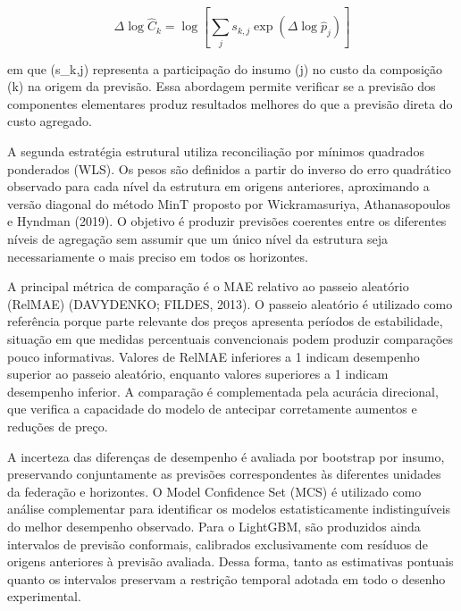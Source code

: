 \begin{equation} 
    \Delta \log \widehat{C}_{k} 
    = 
    \log 
    \left[ 
        \sum_{j} 
        s_{k,j} 
        \exp 
        \left( 
            \Delta \log \widehat{p}_{j} 
            \right) 
            \right] 
            \label{eq:previsao-bottom-up} 
        \end{equation}

em que (s_{k,j}) representa a participação do insumo (j) no custo da composição (k) na origem da previsão. Essa abordagem 
permite verificar se a previsão dos componentes elementares produz resultados melhores do que a previsão direta do custo 
agregado.

A segunda estratégia estrutural utiliza reconciliação por mínimos quadrados ponderados (WLS). Os pesos são definidos a partir 
do inverso do erro quadrático observado para cada nível da estrutura em origens anteriores, aproximando a versão diagonal do 
método MinT proposto por Wickramasuriya, Athanasopoulos e Hyndman (2019). O objetivo é produzir previsões coerentes entre os 
diferentes níveis de agregação sem assumir que um único nível da estrutura seja necessariamente o mais preciso em todos os 
horizontes.

A principal métrica de comparação é o MAE relativo ao passeio aleatório (RelMAE) (DAVYDENKO; FILDES, 2013). O passeio aleatório 
é utilizado como referência porque parte relevante dos preços apresenta períodos de estabilidade, situação em que medidas 
percentuais convencionais podem produzir comparações pouco informativas. Valores de RelMAE inferiores a 1 indicam desempenho 
superior ao passeio aleatório, enquanto valores superiores a 1 indicam desempenho inferior. A comparação é complementada pela 
acurácia direcional, que verifica a capacidade do modelo de antecipar corretamente aumentos e reduções de preço.

A incerteza das diferenças de desempenho é avaliada por bootstrap por insumo, preservando conjuntamente as previsões 
correspondentes às diferentes unidades da federação e horizontes. O Model Confidence Set (MCS) é utilizado como análise 
complementar para identificar os modelos estatisticamente indistinguíveis do melhor desempenho observado. Para o LightGBM, 
são produzidos ainda intervalos de previsão conformais, calibrados exclusivamente com resíduos de origens anteriores à previsão 
avaliada. Dessa forma, tanto as estimativas pontuais quanto os intervalos preservam a restrição temporal adotada em todo o 
desenho experimental.
        
